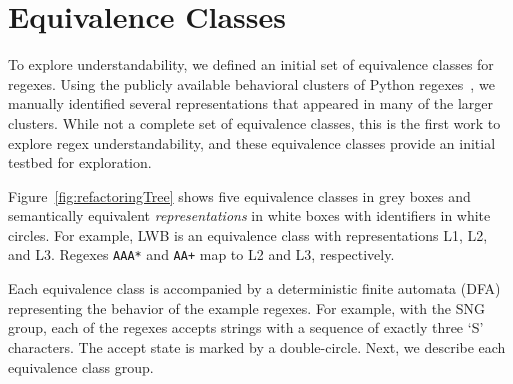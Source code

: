 \section{Equivalence Classes}
\label{sec:refactoring}
To explore understandability, we defined an initial set of equivalence classes for regexes.
Using the publicly available behavioral clusters of Python regexes~\cite{chapman2016}, we manually identified several representations that appeared in many of the larger clusters.
While not a complete set of equivalence classes, this is the first work to explore regex understandability, and these equivalence classes provide an initial testbed for exploration.

Figure~\ref{fig:refactoringTree} shows five equivalence classes in grey boxes and semantically equivalent \emph{representations} in white boxes with identifiers in white circles. For example, LWB is an equivalence class with representations L1, L2, and L3. Regexes \verb!AAA*! and \verb!AA+! map to L2 and L3, respectively.

Each equivalence class is accompanied by a deterministic finite automata (DFA) representing the behavior of the example regexes. For example, with the SNG group, each of the regexes accepts strings with a sequence of exactly three `S' characters. The accept state is marked by a double-circle.
Next, we describe each equivalence class group.


